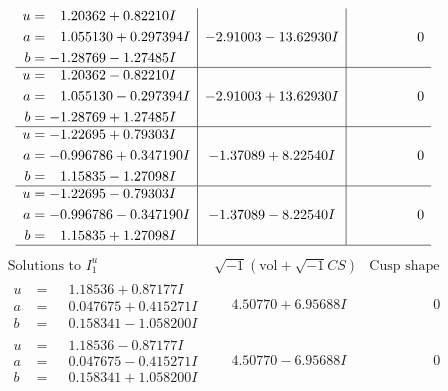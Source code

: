\documentclass[1p]{elsarticle_modified}
\theoremstyle{definition}
\newcommand{\I}{\sqrt{-1}}
\begin{document}
$$\begin{array}{c|c|c}
\begin{aligned}
u &= \phantom{-}1.20362 + 0.82210 I \\
a &= \phantom{-}1.055130 + 0.297394 I \\
b &= -1.28769 - 1.27485 I\end{aligned}
 & -2.91003 - 13.62930 I & \phantom{-0.000000 } 0 \\ \hline\begin{aligned}
u &= \phantom{-}1.20362 - 0.82210 I \\
a &= \phantom{-}1.055130 - 0.297394 I \\
b &= -1.28769 + 1.27485 I\end{aligned}
 & -2.91003 + 13.62930 I & \phantom{-0.000000 } 0 \\ \hline\begin{aligned}
u &= -1.22695 + 0.79303 I \\
a &= -0.996786 + 0.347190 I \\
b &= \phantom{-}1.15835 - 1.27098 I\end{aligned}
 & -1.37089 + 8.22540 I & \phantom{-0.000000 } 0 \\ \hline\begin{aligned}
u &= -1.22695 - 0.79303 I \\
a &= -0.996786 - 0.347190 I \\
b &= \phantom{-}1.15835 + 1.27098 I\end{aligned}
 & -1.37089 - 8.22540 I & \phantom{-0.000000 } 0\\
 \hline 
 \end{array}$$\newpage$$\begin{array}{c|c|c}  
\text{Solutions to }I^u_{1}& \I (\text{vol} + \sqrt{-1}CS) & \text{Cusp shape}\\
 \hline 
\begin{aligned}
u &= \phantom{-}1.18536 + 0.87177 I \\
a &= \phantom{-}0.047675 + 0.415271 I \\
b &= \phantom{-}0.158341 - 1.058200 I\end{aligned}
 & \phantom{-}4.50770 + 6.95688 I & \phantom{-0.000000 } 0 \\ \hline\begin{aligned}
u &= \phantom{-}1.18536 - 0.87177 I \\
a &= \phantom{-}0.047675 - 0.415271 I \\
b &= \phantom{-}0.158341 + 1.058200 I\end{aligned}
 & \phantom{-}4.50770 - 6.95688 I & \phantom{-0.000000 } 0 \\ \hline\begin{aligned}

\end{aligned}
\end{array}$$
\end{document}
